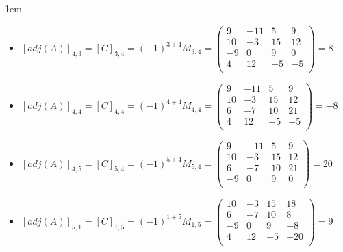 \documentclass[12pt, fleqn]{article}                             %
\newenvironment{SmallIndentation}[1][0.75em]                    %
        {\begin{adjustwidth}{#1}{}\begin{footnotesize}}             %
        {\end{footnotesize}\end{adjustwidth}}                       %
\theoremstyle{break}                                            %
\newcommand{\pVector}[1]                                        %
        { \ensuremath{\begin{pmatrix}#1\end{pmatrix}} }             %
\begin{document}
\begin{itemize}
\begin{SmallIndentation}[1em]
\begin{itemize}
                    \item
                        $[adj(A)]_{4, 3} 
                            = [C]_{3, 4} 
                            = (-1)^{3+4} M_{3, 4}
                            = \pVector{
                                    9  & -11 & 5  & 9    \\
                                    10 & -3  & 15 & 12   \\
                                    -9 & 0   & 9  & 0    \\
                                    4  & 12  & -5 & -5   \\
                                }
                            = 8$

                    \item
                        $[adj(A)]_{4, 4} 
                            = [C]_{4, 4} 
                            = (-1)^{4+4} M_{4, 4}
                            = \pVector{
                                    9  & -11 & 5  & 9    \\
                                    10 & -3  & 15 & 12   \\
                                    6  & -7  & 10 & 21   \\
                                    4  & 12  & -5 & -5   \\
                                }
                            = -8$

                    \item
                        $[adj(A)]_{4, 5} 
                            = [C]_{5, 4} 
                            = (-1)^{5+4} M_{5, 4}
                            = \pVector{
                                    9  & -11 & 5   & 9    \\
                                    10 & -3  & 15  & 12   \\
                                    6  & -7  & 10  & 21   \\
                                    -9 & 0   & 9   & 0    \\
                                }
                            = 20$

                    \item
                        $[adj(A)]_{5, 1} 
                            = [C]_{1, 5} 
                            = (-1)^{1+5} M_{1, 5}
                            = \pVector{
                                    10 & -3  & 15 & 18    \\
                                    6  & -7  & 10 & 8     \\
                                    -9 & 0   & 9  & -8    \\
                                    4  & 12  & -5 & -20   \\
                                }
                            = 9$


\end{itemize}
\end{SmallIndentation}
\end{itemize}
\end{document}
